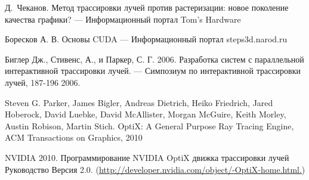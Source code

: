 \newpage
{}
\begin{thebibliography}{0}
Д.~Чеканов. Метод трассировки лучей против растеризации: новое поколение качества графики? ---
 Информационный портал Tom's Hardware

Боресков А. В. Основы CUDA ---  Информационный портал steps3d.narod.ru

Биглер Дж., Стивенс, А., и Паркер, С. Г. 2006. Разработка систем с параллельной интерактивной трассировки лучей. --- Симпозиум по интерактивной трассировки лучей, 187-196 2006.

Steven G. Parker, James Bigler, Andreas Dietrich, Heiko Friedrich, Jared Hoberock, David Luebke,  David McAllister, Morgan McGuire, Keith Morley, Austin Robison, Martin Stich. OptiX: A General Purpose Ray Tracing Engine, ACM Transactions on Graphics, 2010

NVIDIA 2010. Программирование NVIDIA OptiX движка трассировки лучей 
Руководство Версия 2.0. (\href{http://developer.nvidia.com/object/-OptiX-home.html.}{http://developer.nvidia.com/object/-OptiX-home.html.})
\end{thebibliography}
